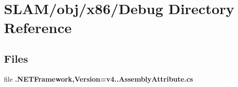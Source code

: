 \section{S\-L\-A\-M/obj/x86/\-Debug Directory Reference}
\label{dir_830b26fd4ee64f348e6da7c6aabd8ab1}
\subsection*{Files}
\begin{DoxyCompactItemize}
\item 
file {\bf .\-N\-E\-T\-Framework,\-Version=v4..\-Assembly\-Attribute.\-cs}
\end{DoxyCompactItemize}
